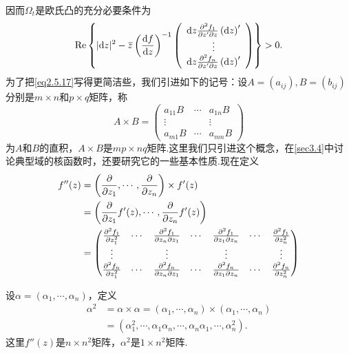 因而$\Omega_t$是欧氏凸的充分必要条件为
\begin{equation}\label{eq2.5.17}
	\operatorname{Re}\left\{|\mathrm{d}z|^2-{}\mkern1mu\overline{\mkern-1muz}\left(\frac{\mathop{}\!\mathrm df}{\mathop{}\!\mathrm dz}\right)^{-1}
	\left(
	\begin{array}{ccc}
		\mathrm{d}z\frac{\partial^2 f_1}{\partial z'\partial z}\left(\mathrm{d}z\right)'\\
		\vdots\\
		\mathrm{d}z\frac{\partial^2 f_n}{\partial z'\partial z}\left(\mathrm{d}z\right)'
	\end{array}\right)\right\}>0.
\end{equation}
为了把\eqref{eq2.5.17}写得更简洁些，我们引进如下的记号：设$A=(a_{ij}),B=(b_{ij})$分别是$m\times n$和$p\times q$矩阵，称
\[A\times B=\begin{pmatrix}
	a_{11}B & \cdots & a_{1n}B\\
	\vdots & & \vdots\\
	a_{m1}B & \cdots & a_{mn}B
\end{pmatrix}\]
为$A$和$B$的直积，$A\times B$是$mp\times nq$矩阵.这里我们只引进这个概念，在\ref{sec3.4}中讨论典型域的核函数时，还要研究它的一些基本性质.现在定义
\begin{align*}
	f''(z)
	&=\left(\frac{\partial }{\partial z_1},\cdots,\frac{\partial }{\partial z_n}\right)\times f'(z)\\
	&=\left(\frac{\partial }{\partial z_1}f'(z),\cdots,\frac{\partial }{\partial z_n}f'(z)\right)\\
	&=\begin{pmatrix}
		\frac{\partial^2 f_1}{\partial z_1^2} & \cdots &\frac{\partial^2 f_1}{\partial z_n\partial z_1} & \cdots & \frac{\partial^2 f_1}{\partial z_1\partial z_n} & \cdots & \frac{\partial^2 f_1}{\partial z_n^2}\\
		\vdots & &\vdots & & \vdots & &\vdots \\
        \frac{\partial^2 f_n}{\partial z_1^2} & \cdots &\frac{\partial^2 f_n}{\partial z_n\partial z_1} & \cdots & \frac{\partial^2 f_n}{\partial z_1\partial z_n} & \cdots & \frac{\partial^2 f_n}{\partial z_n^2}		
	\end{pmatrix}
\end{align*}

设$\alpha=(\alpha_1,\cdots,\alpha_n)$，定义
\begin{align*}
	\alpha^2
	&=\alpha\times\alpha=(\alpha_1,\cdots,\alpha_n)\times(\alpha_1,\cdots,\alpha_n)\\
	&=(\alpha_1^2,\cdots,\alpha_1\alpha_n,\cdots,\alpha_n\alpha_1,\cdots,\alpha_n^2).
\end{align*}
这里$f''(z)$是$n\times n^2$矩阵，$\alpha^2$是$1\times n^2$矩阵.


